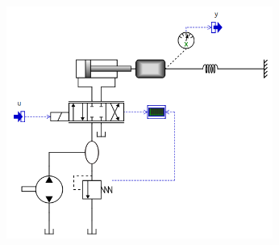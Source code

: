 \documentclass[a4paper]{article}
\begin{document}
\begin{enumerate}

\includegraphics[height=7.593478263cm]{gfx/simulink/model3.png}
















\end{enumerate}
\end{document}
